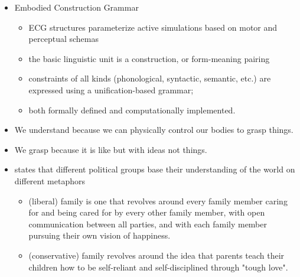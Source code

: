\documentclass[headrule,footrule]{foils}
\begin{document}
\begin{itemize}
\item Embodied Construction Grammar
  \begin{itemize}
  \item  {} ECG structures parameterize active simulations based on motor and perceptual schemas
  \item {} the basic linguistic unit is a construction, or form-meaning pairing
  \item {} constraints of all kinds (phonological, syntactic, semantic, etc.) are expressed using a unification-based grammar;
  \item {} both formally defined and computationally implemented. 
  \end{itemize}
\item We understand  because we can physically control our
  bodies to grasp things.
\item We grasp  because it is like  but with ideas not things.
\end{itemize}


\begin{itemize}
\item \citet{Lakoff:1995} states that different political groups base their
  understanding of the world on different metaphors
  \begin{itemize}
  \item {} (liberal) family is one that revolves
    around every family member caring for and being cared for by every
    other family member, with open communication between all parties,
    and with each family member pursuing their own vision of
    happiness.
  \item {} (conservative) family revolves around the idea that parents teach their children how to be self-reliant and self-disciplined through "tough love". 
  \end{itemize}
\end{itemize}

\end{document}
